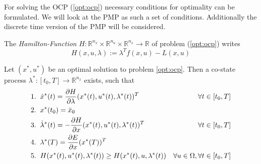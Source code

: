 \documentclass[a4paper, 12pt]{scrreprt} %
\begin{document}

For solving the \ac{OCP} (\ref{opt:ocp}) necessary conditions for optimality can be formulated. We will look at the \ac{PMP} as such a set of conditions. Additionally the discrete time version of the \ac{PMP} will be considered.

\begin{definition}
The \emph{Hamilton-Function} $H:\mathbb R^{n_x} \times \mathbb R^{n_u} \times\mathbb R^{n_x} \to \mathbb R$ of problem (\ref{opt:ocp}) writes
\begin{equation}
H(x,u,\lambda) := \lambda^T f(x,u) - L(x,u)
\label{eq:hamfunc}
\end{equation}
\end{definition}

\begin{myTheorem}
Let $(x^*,u^*)$ be an optimal solution to problem \ref{opt:ocp}. Then a co-state process $\lambda^*:[t_0,T] \to \mathbb R^{n_x}$ exists, such that
\begin{align}
1.&\hspace{0.2cm} \dot x^*(t) =  \frac{\partial H}{\partial \lambda}(x^*(t),u^*(t),\lambda^*(t))^T &\forall t \in [t_0,T] \\
2.&\hspace{0.2cm} x^*(t_0) = \bar x_0 \\
3.&\hspace{0.2cm} \dot \lambda^*(t) = - \frac{\partial H}{\partial x}(x^*(t),u^*(t),\lambda^*(t))^T & \forall t \in [t_0,T] \\
4.&\hspace{0.2cm} \lambda^*(T) = \frac{\partial E}{\partial x}(x^*(T))^T \\
5.&\hspace{0.2cm} H(x^*(t),u^*(t),\lambda^*(t)) \geq H(x^*(t),u,\lambda^*(t)) & \forall u \in \Omega, \forall t \in [t_0,T]
\end{align}
\end{myTheorem}
\end{document}
